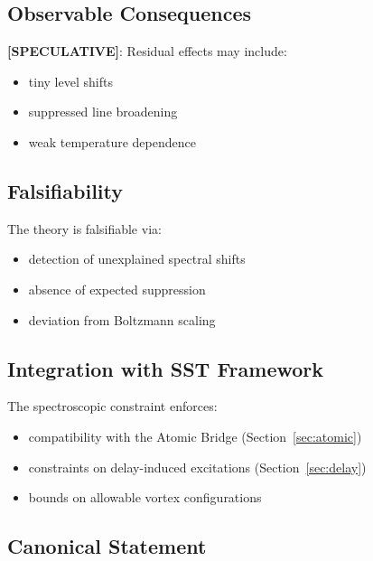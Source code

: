 \documentclass[11pt]{article}
\theoremstyle{definition}
\theoremstyle{plain}
\theoremstyle{remark}
\begin{document}
    \subsection{Observable Consequences}
        
        \textbf{[SPECULATIVE]}:
        Residual effects may include:
        
        \begin{itemize}
            \item tiny level shifts
            \item suppressed line broadening
            \item weak temperature dependence
        \end{itemize}
    
    \subsection{Falsifiability}
        
        The theory is falsifiable via:
        
        \begin{itemize}
            \item detection of unexplained spectral shifts
            \item absence of expected suppression
            \item deviation from Boltzmann scaling
        \end{itemize}
    
    \subsection{Integration with SST Framework}
        
        The spectroscopic constraint enforces:
        
        \begin{itemize}
            \item compatibility with the Atomic Bridge (Section~\ref{sec:atomic})
            \item constraints on delay-induced excitations (Section~\ref{sec:delay})
            \item bounds on allowable vortex configurations
        \end{itemize}
    
    \subsection{Canonical Statement}
        
\end{document}
